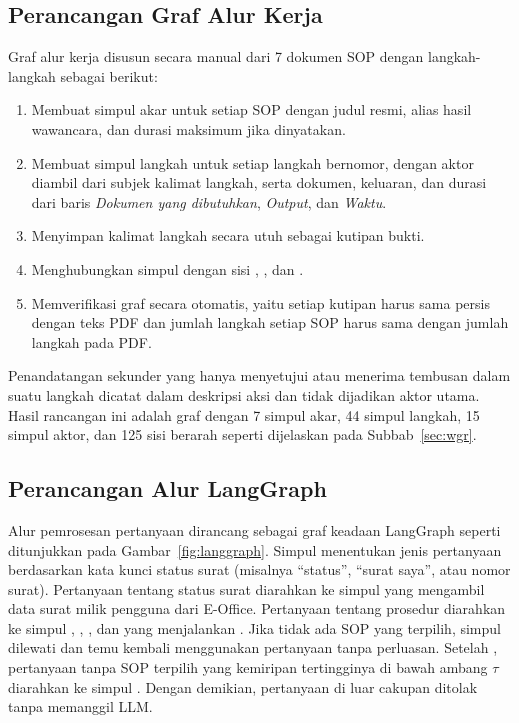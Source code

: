 \subsection{Perancangan Graf Alur Kerja}
\label{sec:rancang-graf}
Graf alur kerja disusun secara manual dari 7 dokumen SOP dengan langkah-langkah sebagai berikut:
\begin{enumerate}
\item Membuat simpul akar untuk setiap SOP dengan judul resmi, alias hasil wawancara, dan durasi maksimum jika dinyatakan.
\item Membuat simpul langkah untuk setiap langkah bernomor, dengan aktor diambil dari subjek kalimat langkah, serta dokumen, keluaran, dan durasi dari baris \textit{Dokumen yang dibutuhkan}, \textit{Output}, dan \textit{Waktu}.
\item Menyimpan kalimat langkah secara utuh sebagai kutipan bukti.
\item Menghubungkan simpul dengan sisi , , dan .
\item Memverifikasi graf secara otomatis, yaitu setiap kutipan harus sama persis dengan teks PDF dan jumlah langkah setiap SOP harus sama dengan jumlah langkah pada PDF.
\end{enumerate}

Penandatangan sekunder yang hanya menyetujui atau menerima tembusan dalam suatu langkah dicatat dalam deskripsi aksi dan tidak dijadikan aktor utama. Hasil rancangan ini adalah graf dengan 7 simpul akar, 44 simpul langkah, 15 simpul aktor, dan 125 sisi berarah seperti dijelaskan pada Subbab~\ref{sec:wgr}.

\subsection{Perancangan Alur LangGraph}
\label{sec:rancang-langgraph}
Alur pemrosesan pertanyaan dirancang sebagai graf keadaan LangGraph seperti ditunjukkan pada Gambar~\ref{fig:langgraph}. Simpul  menentukan jenis pertanyaan berdasarkan kata kunci status surat (misalnya ``status'', ``surat saya'', atau nomor surat). Pertanyaan tentang status surat diarahkan ke simpul  yang mengambil data surat milik pengguna dari E-Office. Pertanyaan tentang prosedur diarahkan ke simpul , , , dan  yang menjalankan \wgr{}. Jika tidak ada SOP yang terpilih, simpul  dilewati dan temu kembali menggunakan pertanyaan tanpa perluasan. Setelah , pertanyaan tanpa SOP terpilih yang kemiripan tertingginya di bawah ambang $\tau$ diarahkan ke simpul . Dengan demikian, pertanyaan di luar cakupan ditolak tanpa memanggil LLM.

